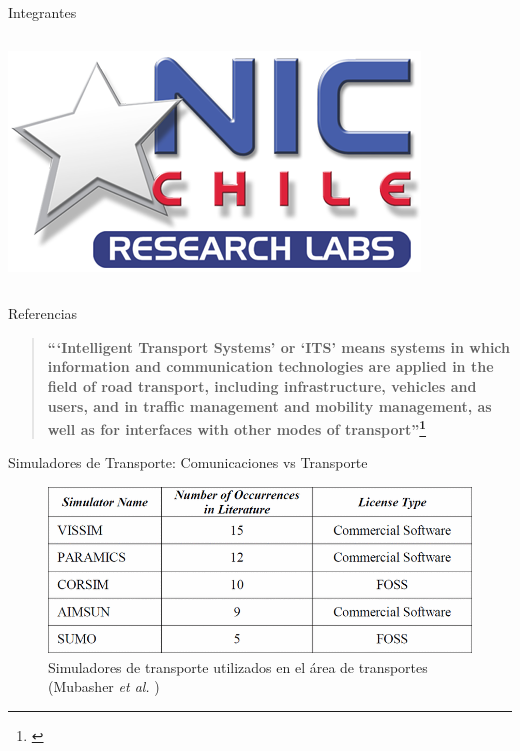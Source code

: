 \documentclass[aspectratio=169]{beamer}
\begin{document}
\begin{frame}{Integrantes}
\begin{columns}
\begin{column}{.5\textwidth}
        \vspace{0.05\textheight}
        \includegraphics[height=.25\textheight]{figuras/niclabs.png}    
    \end{column}
\end{columns}    
\end{frame}

\begin{frame}[c,allowframebreaks]{Referencias}
\printbibliography[heading=none]
\end{frame}

\begin{frame}%
\begin{quote}
    \centering
    \textbf{``‘Intelligent Transport Systems’ or ‘ITS’ means systems in which information and communication technologies are applied in the field of road transport, including infrastructure, vehicles and users, and in traffic management and mobility management, as well as for interfaces with other modes of transport''\footnote{\textcite{eudirective}}}
\end{quote}
\end{frame}

\begin{frame}{Simuladores de Transporte: Comunicaciones vs Transporte}
\begin{figure}[p]
    \centering
    \includegraphics[width=.8\linewidth]{figuras/popular_trafficsims.png}
    \caption{Simuladores de transporte utilizados en el área de transportes\\(Mubasher \emph{et al.} \autocite{traffic_sim_review})}
\end{figure}
\end{frame}
\end{document}
